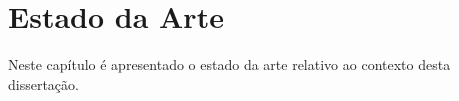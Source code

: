 \chapter{Estado da Arte}

Neste capítulo é apresentado o estado da arte relativo ao contexto desta dissertação.